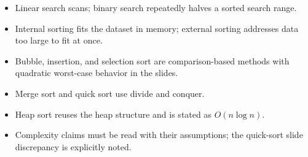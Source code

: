 \begin{chapterrecap}
\begin{itemize}
  \item Linear search scans; binary search repeatedly halves a sorted search range.
  \item Internal sorting fits the dataset in memory; external sorting addresses data too large to fit at once.
  \item Bubble, insertion, and selection sort are comparison-based methods with quadratic worst-case behavior in the slides.
  \item Merge sort and quick sort use divide and conquer.
  \item Heap sort reuses the heap structure and is stated as $O(n\log n)$.
  \item Complexity claims must be read with their assumptions; the quick-sort slide discrepancy is explicitly noted.
\end{itemize}
\end{chapterrecap}


